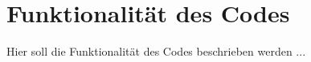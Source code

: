 \section{Funktionalität des Codes} \label{chpt:Implementierung_Funktionalitaet}
Hier soll die Funktionalität des Codes beschrieben werden ...